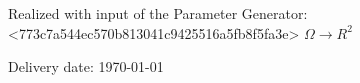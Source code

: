 \begin{large} 
\begin{center}
Realized with input of the Parameter Generator: <773c7a544ec570b813041c9425516a5fb8f5fa3e> $\Omega \longrightarrow R^2$
\end{center}
\end{large} 



\vspace*{-6mm}

\begin{large} 
\begin{center}
Delivery date: \today
\end{center}
\end{large} 


\pagestyle{empty} %

